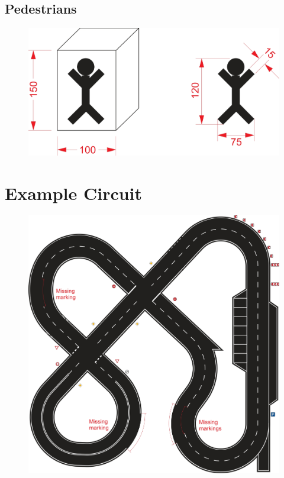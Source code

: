 \subsection{Pedestrians}
\label{fig_pedestrians}
\begin{figure}[H]
	\begin{center}
		\centering\includegraphics[]{graphics/Abb_21_pedestrians.jpg}
	\end{center}
\end{figure}

\section{Example Circuit}
\label{fig_example_circuit}
\vspace*{2cm}
\begin{figure}[H]
	\begin{center}
		\centering\includegraphics[width=\textwidth]{graphics/Abb_22_example_circuit.jpg}
	\end{center}
\end{figure}

